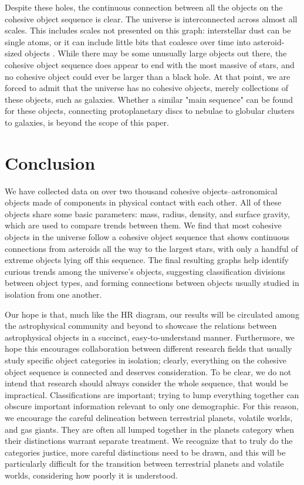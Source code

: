 \documentclass[twocolumn,linenumbers]{aastex631}
\begin{document}
Despite these holes, the continuous connection between all the objects on the cohesive object sequence is clear. The universe is interconnected across almost all scales. This includes scales not presented on this graph: interstellar dust can be single atoms, or it can include little bits that coalesce over time into asteroid-sized objects \citep{Blum2008}. While there may be some unusually large objects out there, the cohesive object sequence does appear to end with the most massive of stars, and no cohesive object could ever be larger than a black hole. At that point, we are forced to admit that the universe has no cohesive objects, merely collections of these objects, such as galaxies. Whether a similar "main sequence" can be found for these objects, connecting protoplanetary discs to nebulae to globular clusters to galaxies, is beyond the scope of this paper. 

\section{Conclusion} \label{sec:intro}

We have collected data on over two thousand cohesive objects--astronomical objects made of components in physical contact with each other. All of these objects share some basic parameters: mass, radius, density, and surface gravity, which are used to compare trends between them. We find that most cohesive objects in the universe follow a cohesive object sequence that shows continuous connections from asteroids all the way to the largest stars, with only a handful of extreme objects lying off this sequence. The final resulting graphs help identify curious trends among the universe's objects, suggesting classification divisions between object types, and forming connections between objects usually studied in isolation from one another. 

Our hope is that, much like the HR diagram, our results will be circulated among the astrophysical community and beyond to showcase the relations between astrophysical objects in a succinct, easy-to-understand manner. Furthermore, we hope this encourages collaboration between different research fields that usually study specific object categories in isolation; clearly, everything on the cohesive object sequence is connected and deserves consideration. To be clear, we do not intend that research should always consider the whole sequence, that would be impractical. Classifications are important; trying to lump everything together can obscure important information relevant to only one demographic. For this reason, we encourage the careful delineation between terrestrial planets, volatile worlds, and gas giants. They are often all lumped together in the planets category when their distinctions warrant separate treatment. We recognize that to truly do the categories justice, more careful distinctions need to be drawn, and this will be particularly difficult for the transition between terrestrial planets and volatile worlds, considering how poorly it is understood. 
\end{document}
